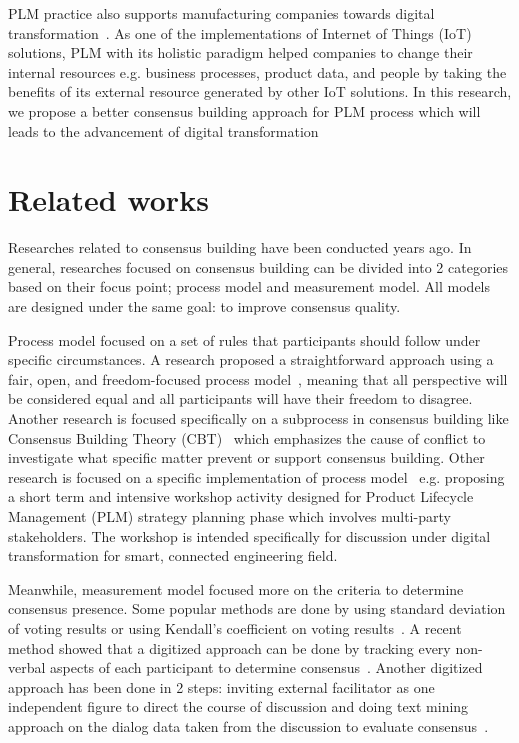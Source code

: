 \documentclass[senior]{IPSstyle}
\begin{document}
PLM practice also supports manufacturing companies towards digital transformation~\cite{matt}. As one of the implementations of Internet of Things (IoT) solutions, PLM with its holistic paradigm helped companies to change their internal resources e.g. business processes, product data, and people by taking the benefits of its external resource generated by other IoT solutions. In this research, we propose a better consensus building approach for PLM process which will leads to the advancement of digital transformation

\section{Related works}

Researches related to consensus building have been conducted years ago. In general, researches focused on consensus building can be divided into 2 categories based on their focus point; process model and measurement model. All models are designed under the same goal: to improve consensus quality.

Process model focused on a set of rules that participants should follow under specific circumstances. A research proposed a straightforward approach using a fair, open, and freedom-focused process model~\cite{butler}, meaning that all perspective will be considered equal and all participants will have their freedom to disagree. Another research is focused specifically on a subprocess in consensus building like Consensus Building Theory (CBT)~\cite{briggs} which emphasizes the cause of conflict to investigate what specific matter prevent or support consensus building. Other research is focused on a specific implementation of process model~\cite{goto1} e.g. proposing a short term and intensive workshop activity designed for Product Lifecycle Management (PLM) strategy planning phase which involves multi-party stakeholders. The workshop is intended specifically for discussion under digital transformation for smart, connected engineering field.

Meanwhile, measurement model focused more on the criteria to determine consensus presence. Some popular methods are done by using standard deviation of voting results or using Kendall’s coefficient on voting results~\cite{shepherd}. A recent method showed that a digitized approach can be done by tracking every non-verbal aspects of each participant to determine consensus~\cite{katagiri}. Another digitized approach has been done in 2 steps: inviting external facilitator as one independent figure to direct the course of discussion and doing text mining approach on the dialog data taken from the discussion to evaluate consensus~\cite{goto2}.
\end{document}
